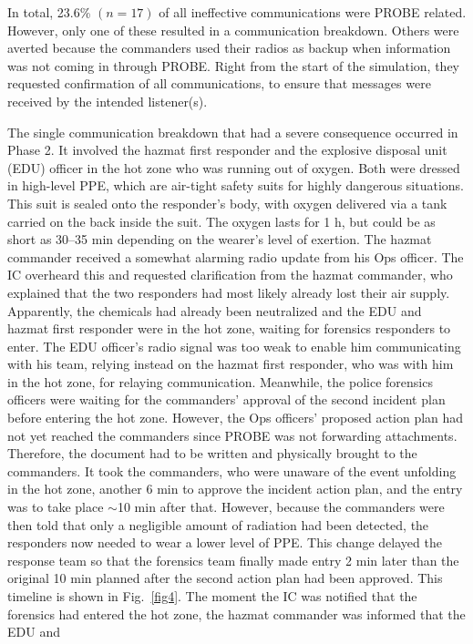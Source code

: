 \documentclass[link]{IWCOMP}
\begin{document}
In total, 23.6{\%} $(n = 17)$ of all ineffective communications were PROBE
related. However, only one of these resulted in a communication breakdown.
Others were averted because the commanders used their radios as backup when
information was not coming in through PROBE. Right from the start of the
simulation, they requested confirmation of all communications, to ensure
that messages were received by the intended listener(s).

The single communication breakdown that had a severe consequence occurred in
Phase 2. It involved the hazmat first responder and the explosive disposal
unit (EDU) officer in the hot zone who was running out of oxygen. Both were
dressed in high-level PPE, which are air-tight safety suits for highly
dangerous situations. This suit is sealed onto the responder's body, with
oxygen delivered via a tank carried on the back inside the suit. The oxygen
lasts for 1 h, but could be as short as 30--35 min depending on the wearer's
level of exertion. The hazmat commander received a somewhat alarming radio
update from his Ops officer. The IC overheard this and requested
clarification from the hazmat commander, who explained that the two
responders had most likely already lost their air supply. Apparently, the
chemicals had already been neutralized and the EDU and hazmat first
responder were in the hot zone, waiting for forensics responders to enter.
The EDU officer's radio signal was too weak to enable him communicating with
his team, relying instead on the hazmat first responder, who was with him in
the hot zone, for relaying communication. Meanwhile, the police forensics
officers were waiting for the commanders' approval of the second incident
plan before entering the hot zone. However, the Ops officers' proposed
action plan had not yet reached the commanders since PROBE was not
forwarding attachments. Therefore, the document had to be written and
physically brought to the commanders. It took the commanders, who were
unaware of the event unfolding in the hot zone, another 6 min to approve the
incident action plan, and the entry was to take place $\sim$10 min
after that. However, because the commanders were then told that only a
negligible amount of radiation had been detected, the responders now needed
to wear a lower level of PPE. This change delayed the response team so that
the forensics team finally made entry 2 min later than the original 10 min
planned after the second action plan had been approved. This timeline is
shown in Fig.~\ref{fig4}. The moment the IC was notified that the forensics had
entered the hot zone, the hazmat commander was informed that the EDU and
\end{document}
